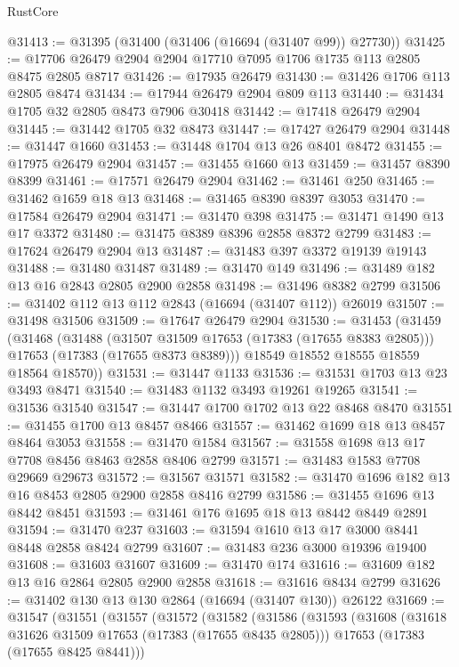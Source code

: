 \begin{lexlean}{RustCore}
\begin{coremodule}
@31413 := @31395 (@31400 (@31406 (@16694 (@31407 @99)) @27730))
@31425 := @17706 @26479 @2904 @2904 @17710 @7095 @1706 @1735 @113 @2805 @8475 @2805 @8717
@31426 := @17935 @26479
@31430 := @31426 @1706 @113 @2805 @8474
@31434 := @17944 @26479 @2904 @809 @113
@31440 := @31434 @1705 @32 @2805 @8473 @7906 @30418
@31442 := @17418 @26479 @2904
@31445 := @31442 @1705 @32 @8473
@31447 := @17427 @26479 @2904
@31448 := @31447 @1660
@31453 := @31448 @1704 @13 @26 @8401 @8472
@31455 := @17975 @26479 @2904
@31457 := @31455 @1660 @13
@31459 := @31457 @8390 @8399
@31461 := @17571 @26479 @2904
@31462 := @31461 @250
@31465 := @31462 @1659 @18 @13
@31468 := @31465 @8390 @8397 @3053
@31470 := @17584 @26479 @2904
@31471 := @31470 @398
@31475 := @31471 @1490 @13 @17 @3372
@31480 := @31475 @8389 @8396 @2858 @8372 @2799
@31483 := @17624 @26479 @2904 @13
@31487 := @31483 @397 @3372 @19139 @19143
@31488 := @31480 @31487
@31489 := @31470 @149
@31496 := @31489 @182 @13 @16 @2843 @2805 @2900 @2858
@31498 := @31496 @8382 @2799
@31506 := @31402 @112 @13 @112 @2843 (@16694 (@31407 @112)) @26019
@31507 := @31498 @31506
@31509 := @17647 @26479 @2904
@31530 := @31453
    (@31459
      (@31468
        (@31488
          (@31507 @31509 @17653 (@17383 (@17655 @8383 @2805)))
          @17653
          (@17383 (@17655 @8373 @8389)))
        @18549
        @18552
        @18555
        @18559
        @18564
        @18570))
@31531 := @31447 @1133
@31536 := @31531 @1703 @13 @23 @3493 @8471
@31540 := @31483 @1132 @3493 @19261 @19265
@31541 := @31536 @31540
@31547 := @31447 @1700 @1702 @13 @22 @8468 @8470
@31551 := @31455 @1700 @13 @8457 @8466
@31557 := @31462 @1699 @18 @13 @8457 @8464 @3053
@31558 := @31470 @1584
@31567 := @31558 @1698 @13 @17 @7708 @8456 @8463 @2858 @8406 @2799
@31571 := @31483 @1583 @7708 @29669 @29673
@31572 := @31567 @31571
@31582 := @31470 @1696 @182 @13 @16 @8453 @2805 @2900 @2858 @8416 @2799
@31586 := @31455 @1696 @13 @8442 @8451
@31593 := @31461 @176 @1695 @18 @13 @8442 @8449 @2891
@31594 := @31470 @237
@31603 := @31594 @1610 @13 @17 @3000 @8441 @8448 @2858 @8424 @2799
@31607 := @31483 @236 @3000 @19396 @19400
@31608 := @31603 @31607
@31609 := @31470 @174
@31616 := @31609 @182 @13 @16 @2864 @2805 @2900 @2858
@31618 := @31616 @8434 @2799
@31626 := @31402 @130 @13 @130 @2864 (@16694 (@31407 @130)) @26122
@31669 := @31547
    (@31551
      (@31557
        (@31572
          (@31582
            (@31586
              (@31593
                (@31608
                  (@31618 @31626 @31509 @17653 (@17383 (@17655 @8435 @2805)))
                  @17653
                  (@17383 (@17655 @8425 @8441)))

\end{coremodule}
\end{lexlean}
